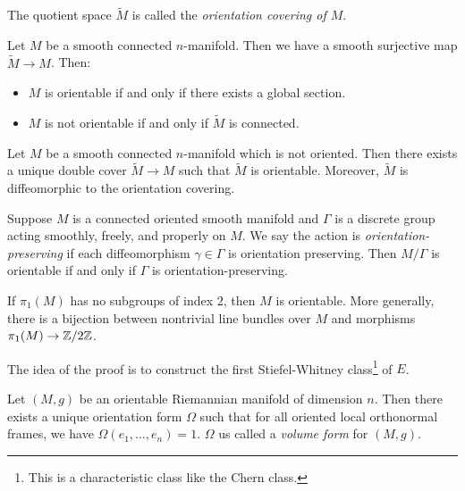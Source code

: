 \documentclass[twoside, 10pt]{article}
\begin{document}
    \begin{defn}
        The quotient space $\widetilde{M}$ is called the \textit{orientation covering of $M$}.
    \end{defn}

    \begin{thm}
        Let $M$ be a smooth connected $n$-manifold. Then we have a smooth surjective map $\widetilde{M} \to M$. Then:
        \begin{itemize}
            \item $M$ is orientable if and only if there exists a global section.
            \item $M$ is not orientable if and only if $\widetilde{M}$ is connected.
        \end{itemize}
    \end{thm}

    \begin{thm}
        Let $M$ be a smooth connected $n$-manifold which is not oriented. Then there exists a unique double cover $\widetilde{M} \to M$ such that $\widetilde{M}$ is orientable. Moreover, $\widetilde{M}$ is diffeomorphic to the orientation covering.
    \end{thm}

    \begin{prop}
        Suppose $M$ is a connected oriented smooth manifold and $\Gamma$ is a discrete group acting smoothly, freely, and properly on $M$. We say the action is \textit{orientation-preserving} if each diffeomorphism $\gamma \in \Gamma$ is orientation preserving. Then $M/\Gamma$ is orientable if and only if $\Gamma$ is orientation-preserving.
    \end{prop}

    \begin{cor}
        If $\pi_1(M)$ has no subgroups of index $2$, then $M$ is orientable. More generally, there is a bijection between nontrivial line bundles over $M$ and morphisms $\pi_1(M) \to \mathbb{Z}/2\mathbb{Z}$.
    \end{cor}

    The idea of the proof is to construct the first Stiefel-Whitney class\footnote{This is a characteristic class like the Chern class.} of $E$. 

    \begin{prop}
        Let $(M,g)$ be an orientable Riemannian manifold of dimension $n$. Then there exists a unique orientation form $\Omega$ such that for all oriented local orthonormal frames, we have $\Omega(e_1, \ldots, e_n) = 1$. $\Omega$ us called a \textit{volume form} for $(M,g)$.
    \end{prop}
\end{document}
